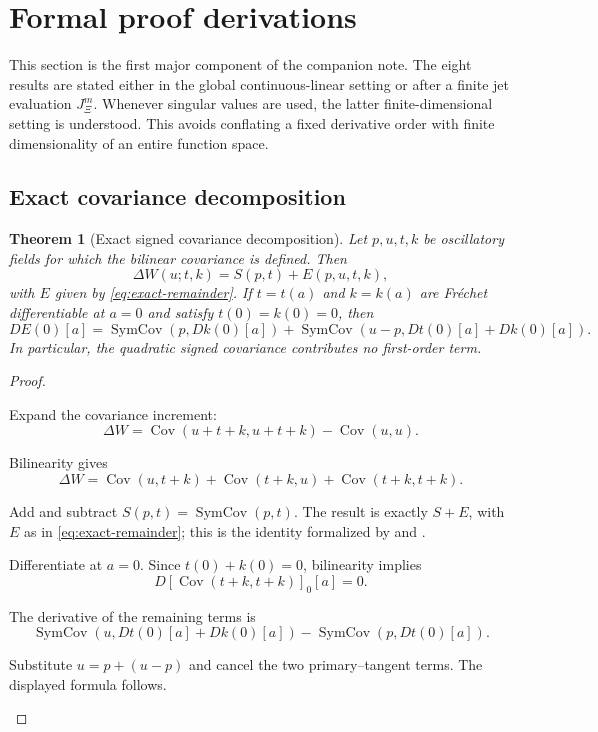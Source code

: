 \documentclass[12pt]{article}
\theoremstyle{plain}
\newtheorem{theorem}{Theorem}[section]
\theoremstyle{definition}
\theoremstyle{remark}
\newcommand{\Cov}{\operatorname{Cov}}
\newcommand{\SymCov}{\operatorname{SymCov}}
\begin{document}
\section{Formal proof derivations}\label{sec:formal-derivations}
This section is the first major component of the companion note. The eight results are stated either in the global continuous-linear setting or after a finite jet evaluation \(J^m_{\Xi}\). Whenever singular values are used, the latter finite-dimensional setting is understood. This avoids conflating a fixed derivative order with finite dimensionality of an entire function space.

\subsection{Exact covariance decomposition}
\begin{theorem}[Exact signed covariance decomposition]\label{thm:covsplit}
Let \(p,u,t,k\) be oscillatory fields for which the bilinear covariance is defined. Then
\[
\boxed{\Delta W(u;t,k)=S(p,t)+E(p,u,t,k),}
\]
with \(E\) given by \eqref{eq:exact-remainder}. If \(t=t(a)\) and \(k=k(a)\) are Fr\'echet differentiable at \(a=0\) and satisfy \(t(0)=k(0)=0\), then
\[
\boxed{
DE(0)[a]
=\SymCov(p,Dk(0)[a])
+\SymCov(u-p,Dt(0)[a]+Dk(0)[a]).
}
\]
In particular, the quadratic signed covariance contributes no first-order term.
\end{theorem}

\begin{proof}
\begin{prooflines}
\item Expand the covariance increment:
\[
\Delta W=\Cov(u+t+k,u+t+k)-\Cov(u,u).
\]
\item Bilinearity gives
\[
\Delta W=\Cov(u,t+k)+\Cov(t+k,u)+\Cov(t+k,t+k).
\]
\item Add and subtract \(S(p,t)=\SymCov(p,t)\). The result is exactly \(S+E\), with \(E\) as in \eqref{eq:exact-remainder}; this is the identity formalized by  and  \cite{OpenAILeanRepo2026}.
\item Differentiate at \(a=0\). Since \(t(0)+k(0)=0\), bilinearity implies
\[
D\!\left[\Cov(t+k,t+k)\right]_{0}[a]=0.
\]
\item The derivative of the remaining terms is
\[
\SymCov(u,Dt(0)[a]+Dk(0)[a])-\SymCov(p,Dt(0)[a]).
\]
\item Substitute \(u=p+(u-p)\) and cancel the two primary--tangent terms. The displayed formula follows.
\end{prooflines}
\end{proof}
\end{document}
